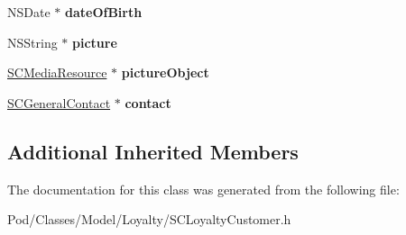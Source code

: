 \begin{DoxyCompactItemize}
\item 
N\+S\+Date $\ast$ {\bfseries date\+Of\+Birth}\hypertarget{interface_s_c_loyalty_customer_a76ea2b4077ef4e1d8abeed97bd8395c3}{}\label{interface_s_c_loyalty_customer_a76ea2b4077ef4e1d8abeed97bd8395c3}

\item 
N\+S\+String $\ast$ {\bfseries picture}\hypertarget{interface_s_c_loyalty_customer_a93205b1fa5180e4dbb82d5c55eddf4b6}{}\label{interface_s_c_loyalty_customer_a93205b1fa5180e4dbb82d5c55eddf4b6}

\item 
\hyperlink{interface_s_c_media_resource}{S\+C\+Media\+Resource} $\ast$ {\bfseries picture\+Object}\hypertarget{interface_s_c_loyalty_customer_a5df1c0c0afe61cbd6a3f086c62355014}{}\label{interface_s_c_loyalty_customer_a5df1c0c0afe61cbd6a3f086c62355014}

\item 
\hyperlink{interface_s_c_general_contact}{S\+C\+General\+Contact} $\ast$ {\bfseries contact}\hypertarget{interface_s_c_loyalty_customer_af659cf46bde3d9a263871b0fb2bc69fe}{}\label{interface_s_c_loyalty_customer_af659cf46bde3d9a263871b0fb2bc69fe}

\end{DoxyCompactItemize}
\subsection*{Additional Inherited Members}


The documentation for this class was generated from the following file\+:\begin{DoxyCompactItemize}
\item 
Pod/\+Classes/\+Model/\+Loyalty/S\+C\+Loyalty\+Customer.\+h\end{DoxyCompactItemize}
